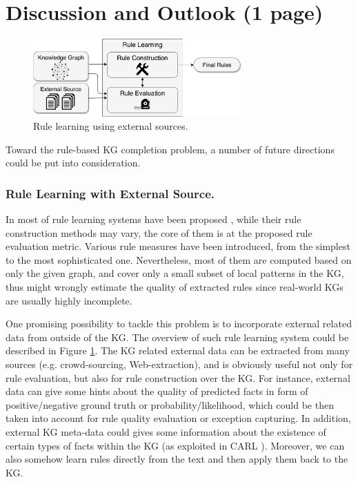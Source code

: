 \section{Discussion and Outlook (1 page)}
\label{sec:discussion_outlook}
\begin{figure}[t]
\centering
\includegraphics[width=8cm]{figures/discussion_overview}
\caption{Rule learning using external sources.}
\label{fig:discussion_overview}
\end{figure}
Toward the rule-based KG completion problem, a number of future directions could be put into consideration.
\subsubsection{Rule Learning with External Source.}
In most of rule learning systems have been proposed \cite{amie,op,rdf2rules}, while their rule construction methods may vary, the core of them is at the proposed rule evaluation metric. Various rule measures have been introduced, from the simplest to the most sophisticated one. Nevertheless, most of them are computed based on only the given graph, and cover only a small subset of local patterns in the KG, thus might wrongly estimate the quality of extracted rules since real-world KGs are usually highly incomplete.

One promising possibility to tackle this problem is to incorporate external related data from outside of the KG. The overview of such rule learning system could be described in Figure \ref{fig:discussion_overview}. The KG related external data can be extracted from many sources (e.g. crowd-sourcing, Web-extraction), and is obviously useful not only for rule evaluation, but also for rule construction over the KG. For instance, external data can give some hints about the quality of predicted facts in form of positive/negative ground truth or probability/likelihood, which could be then taken into account for rule quality evaluation or exception capturing. In addition, external KG meta-data could gives some information about the existence of certain types of facts within the KG (as exploited in CARL \cite{carl}). Moreover, we can also somehow learn rules directly from the text and then apply them back to the KG.

